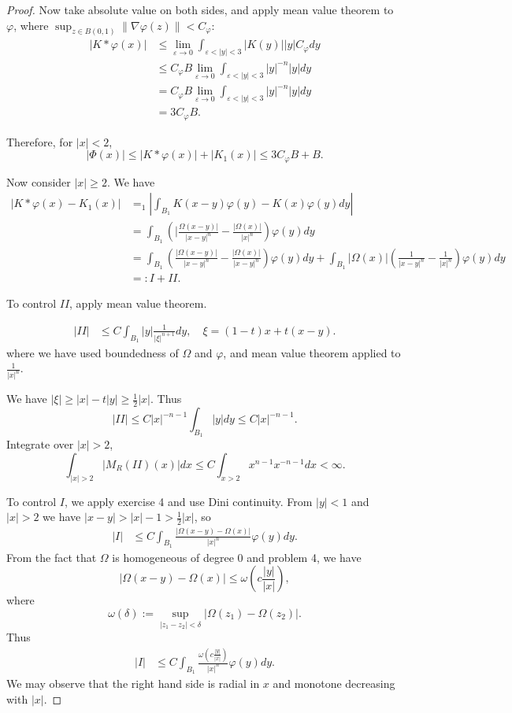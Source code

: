 \begin{enumerate}
\begin{proof}
	Now take absolute value on both sides, and apply mean value theorem to $\varphi$, where $\sup_{z \in B(0,1)} \|\nabla  \varphi(z)\| < C_\varphi$:
	\begin{align*}
		|K*\varphi(x)|
		&\leq \lim_{\varepsilon \to 0} \int _{\varepsilon < |y| < 3} |K(y)| |y| C_\varphi dy\\
		&\leq C_\varphi B\lim_{\varepsilon \to 0} \int _{\varepsilon < |y| < 3} |y|^{-n} |y| d y\\
		&= C_\varphi B\lim_{\varepsilon \to 0} \int _{\varepsilon < |y| < 3} |y|^{-n} |y| d y\\
		&= 3 C_\varphi B
	.\end{align*}

	Therefore, for $|x| < 2$,
	\[
		|\Phi(x)| \le |K * \varphi(x)| + |K_1(x)| \le 3 C_\varphi B + B
	.\] 

	Now consider $|x| \ge 2$. We have
	\begin{align*}
		|K*\varphi(x) - K_1(x)|
		&=_1 |\int_{B_1} K(x -y) \varphi(y) - K(x) \varphi(y) dy|\\
		&= \int_{B_1}\left( |\frac{\Omega(x - y)|}{|x - y|^n} - \frac{|\Omega(x)|}{|x|^n} \right) \varphi(y) d y\\
		&= \int_{B_1}\left( \frac{|\Omega(x - y)|}{|x - y|^n} - \frac{|\Omega(x)|}{|x - y|^n} \right) \varphi(y) d y + 
	\int_{B_1}|\Omega(x)|\left( \frac{1}{|x - y|^n} - \frac{1}{|x|^n} \right) \varphi(y) d y	\\
	&=: I + II
	.\end{align*}

	To control $II$, apply mean value theorem. 

	\begin{align*}
		|II|
		&\leq C \int _{B_1} |y| \frac{1}{|\xi|^{n + 1}} d y, \quad \xi = (1 - t)x + t(x - y)
	.\end{align*}
	where we have used boundedness of $\Omega$ and $\varphi$, and mean value theorem applied to $\frac{1}{|x|^n}.$

	We have $|\xi| \ge |x| - t |y| \ge \frac{1}{2} |x|$. Thus
	\[
		|II| \le C |x|^{- n - 1} \int _{B_1} |y| d y \le C |x|^{- n - 1}
	.\] 
	Integrate over $|x| > 2$,
	\[
		\int _{|x| > 2} |M_R(II)(x)| dx \le C \int _{x > 2} x^{n - 1} x^{- n - 1} dx < \infty 
	.\] 

	To control  $I$, we apply exercise 4 and use Dini continuity. 
	From $|y| < 1$ and $|x| > 2$ we have $|x - y| > |x| - 1 > \frac{1}{2} |x|$, so
	\begin{align*}
		|I|
		&\leq C \int _{B_1} \frac{|\Omega(x - y) - \Omega(x)|}{|x|^n} \varphi(y) d y 
	.\end{align*}
	From the fact that $\Omega$ is homogeneous of degree 0 and problem 4, we have
	\[
		|\Omega(x -y) - \Omega(x)| \le  \omega(c \frac{|y|}{|x|})
	,\] 
	where
	\[
		\omega(\delta) := \sup _{|z_1 - z_2| < \delta} \left| \Omega(z_1) - \Omega(z_2) \right| 
	.\] 
	Thus
	\begin{align*}
		|I| 
		&\le C \int _{B_1} \frac{\omega\left( c \frac{|y|}{|x|} \right) }{|x|^n} \varphi(y) d y
	.\end{align*}
	 We may observe that the right hand side is radial in $x$ and monotone decreasing with $|x|$.
	 

\end{proof}
\end{enumerate}

